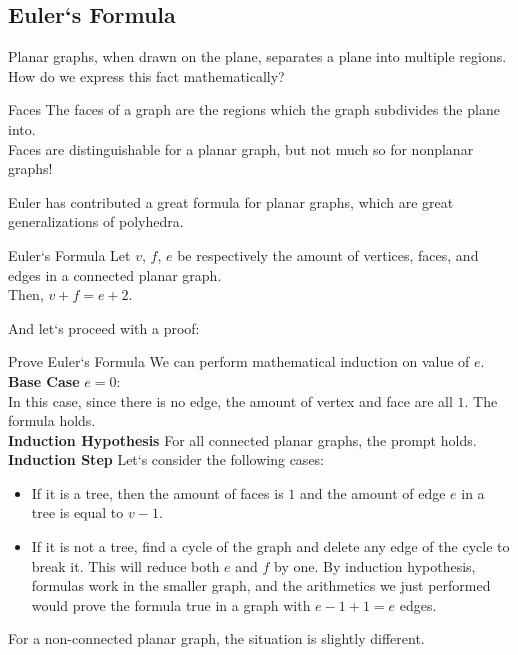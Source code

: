 \subsection{Euler`s Formula}
Planar graphs, when drawn on the plane, separates a plane into multiple regions. How do we express this fact mathematically?
\begin{ln-define}{Faces}{}
    The faces of a graph are the regions which the graph subdivides the plane into. \\
    Faces are distinguishable for a planar graph, but not much so for nonplanar graphs!
\end{ln-define}
Euler has contributed a great formula for planar graphs, which are great generalizations of polyhedra.
\begin{ln-theorem}{Euler`s Formula}{}
    Let $v$, $f$, $e$ be respectively the amount of vertices, faces, and edges in a connected planar graph. \\
    Then, $v + f = e + 2$.
\end{ln-theorem}
And let`s proceed with a proof:
\begin{ln-quest}{Prove Euler`s Formula}{}
    We can perform mathematical induction on value of $e$. \\
    \textbf{Base Case} $e = 0$:\\
    In this case, since there is no edge, the amount of vertex and face are all $1$. The formula holds. \\
    \textbf{Induction Hypothesis} For all connected planar graphs, the prompt holds. \\
    \textbf{Induction Step} Let`s consider the following cases:
    \begin{itemize}
        \item If it is a tree, then the amount of faces is $1$ and the amount of edge $e$ in a tree is equal to $v - 1$.
        \item If it is not a tree, find a cycle of the graph and delete any edge of the cycle to break it. This will reduce both $e$ and $f$ by one. By induction hypothesis, formulas work in the smaller graph, and the arithmetics we just performed would prove the formula true in a graph with $e - 1 + 1 = e$ edges.
    \end{itemize}
\end{ln-quest}
For a non-connected planar graph, the situation is slightly different.
